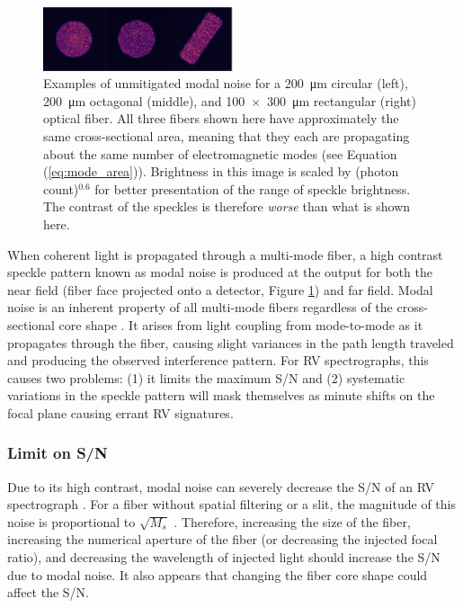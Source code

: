 \documentclass[11pt]{article}
\begin{document}
\begin{figure}
    \begin{center}
	    \includegraphics[width=0.5\textwidth]{images/fiber_example.pdf}
	\end{center}
	\caption{Examples of unmitigated modal noise for a \SI{200}{\micro\meter} circular (left), \SI{200}{\micro\meter} octagonal (middle), and \SI{100x300}{\micro\meter} rectangular (right) optical fiber. All three fibers shown here have approximately the same cross-sectional area, meaning that they each are propagating about the same number of electromagnetic modes (see Equation (\ref{eq:mode_area})). Brightness in this image is scaled by (photon count)$^{0.6}$ for better presentation of the range of speckle brightness. The contrast of the speckles is therefore \textit{worse} than what is shown here.}
\label{fig:fiber_example}
\end{figure}

When coherent light is propagated through a multi-mode fiber, a high contrast speckle pattern known as modal noise is produced at the output for both the near field (fiber face projected onto a detector, Figure \ref{fig:fiber_example}) and far field. Modal noise is an inherent property of all multi-mode fibers regardless of the cross-sectional core shape \citep{Sablowski2016}. It arises from light coupling from mode-to-mode as it propagates through the fiber, causing slight variances in the path length traveled and producing the observed interference pattern. For RV spectrographs, this causes two problems: (1) it limits the maximum S/N and (2) systematic variations in the speckle pattern will mask themselves as minute shifts on the focal plane causing errant RV signatures.

\subsubsection{Limit on S/N}

Due to its high contrast, modal noise can severely decrease the S/N of an RV spectrograph \citep{Epworth1978, Baudrand2001, Lemke2011, Iuzzolino2014}. For a fiber without spatial filtering or a slit, the magnitude of this noise is proportional to $\sqrt{M_s}$ \citep{Goodman1981}. Therefore, increasing the size of the fiber, increasing the numerical aperture of the fiber (or decreasing the injected focal ratio), and decreasing the wavelength of injected light should increase the S/N due to modal noise. It also appears that changing the fiber core shape could affect the S/N.
\end{document}
